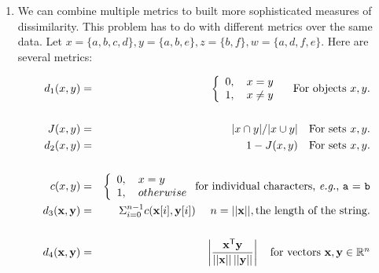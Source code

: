 \documentclass{article}
\begin{document}
\begin{enumerate}
\item  We can combine multiple metrics to built more sophisticated measures of dissimilarity. This problem has to do with different metrics over the same data.  Let  $x = \{a,b,c,d\}, y = \{a, b, e\}, z = \{b, f\}, w = \{a,d,f,e\}$.  Here are several metrics:

 \begin{eqnarray*}
 d_1(x,y) &=& \left\{\begin{array}{l} 0,\ \ \ x = y \\ 1,\ \ \  x\neq y \end{array}\right.\ \ \ \mbox{For objects $x,y$}. \\
 &&\\
 J(x,y) &=&|x \cap y|/|x \cup y|\ \ \ \mbox{\rm For sets $x,y$.} \\   d_2(x,y) &=& 1-J(x,y)\ \ \ \mbox{\rm For sets $x,y$.}\\
 &&\\
c(x,y) &=& \left\{\begin{array}{l}0, \ \ \ x = y\\ 1, \ \ \ otherwise\end{array}\right. \mbox{\rm for individual characters, {\it e.g.}, \texttt{a} = \texttt{b}}\\
d_3(\mathrm{\bf x},\mathrm{\bf y}) &=& \Sigma_{i=0}^{n-1}c(\mathrm{\bf x}[i], \mathrm{\bf y}[i]) \ \ \ \ n = ||\mathrm{\bf x}||, \mbox{\rm the length of the string.}\\
&&\\
d_4(\mathbf{x},\mathbf{y}) &=& \left|{\frac{\mathbf{x}^{\mathsf{T}}\mathbf{y}}{||\mathbf{x}||\,||\mathbf{y}||}}\right| \ \ \ \mbox{\rm for vectors $\mathbf{x}, \mathbf{y} \in \mathbb{R}^n$} 
 \end{eqnarray*}
 

\end{enumerate}
\end{document}

